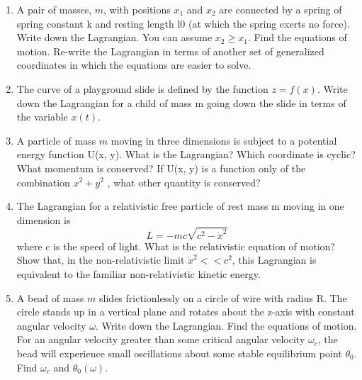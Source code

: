 \documentclass[fleqn]{article}
\begin{document}
\begin{enumerate}
    \item A pair of masses, $m$, with positions $x_1$ and $x_2$ are connected by a spring
    of spring constant k and resting length l0 (at which the spring exerts no
    force). Write down the Lagrangian. You can assume $x_2 ≥ x_1$. Find the
    equations of motion. Re-write the Lagrangian in terms of another set
    of generalized coordinates in which the equations are easier to solve.

    \item The curve of a playground slide is defined by the function $z = f(x)$.
    Write down the Lagrangian for a child of mass m going down the slide
    in terms of the variable $x(t)$.

    
    \item  A particle of mass $m$ moving in three dimensions is subject to a potential energy function U(x, y). What is the Lagrangian? Which coordinate is cyclic? What momentum is conserved? If U(x, y) is a function
    only of the combination $x^2 + y^2$ , what other quantity is conserved?

    \item The Lagrangian for a relativistic free particle of rest mass m moving in
    one dimension is
    $$L=-mc\sqrt{c^2-\dot{x}^2}$$
    where c is the speed of light. What is the relativistic equation of motion? Show that, in the non-relativistic limit
    $\dot{x}^2 <<c^2$, this Lagrangian is equivalent to the familiar non-relativistic kinetic energy.   

    \item A bead of mass $m$ slides frictionlessly on a circle of wire with radius R.
    The circle stands up in a vertical plane and rotates about the z-axis
    with constant angular velocity $\omega$. Write down the Lagrangian. Find
    the equations of motion. For an angular velocity greater than some
    critical angular velocity $\omega_c$, the bead will experience small oscillations
    about some stable equilibrium point $\theta_0$. Find $\omega_c$ and $\theta_0(\omega)$.
  \end{enumerate}
\end{document}
